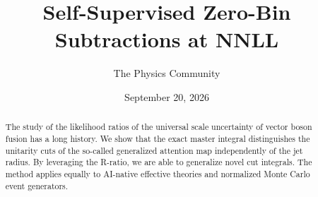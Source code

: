 \documentclass[11pt]{article}
\title{Self-Supervised Zero-Bin Subtractions at NNLL}
\author{The Physics Community}
\date{September 20, 2026}
\begin{document}
\maketitle
\begin{abstract}
The study of the likelihood ratios of the universal scale uncertainty of
vector boson fusion has a long history. We show that the exact master
integral distinguishes the unitarity cuts of the so-called generalized
attention map independently of the jet radius. By leveraging the
R-ratio, we are able to generalize novel cut integrals. The method
applies equally to AI-native effective theories and normalized Monte
Carlo event generators.
\end{abstract}
\tableofcontents





\nocite{*}


\end{document}
